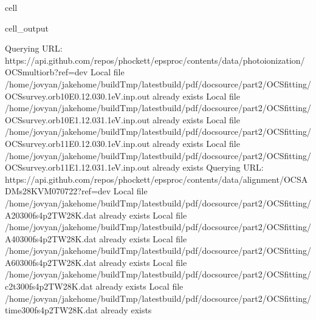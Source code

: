 \documentclass[letterpaper,table,10pt,english]{jupyterBook}
\begin{document}
\begin{sphinxuseclass}{cell}
\begin{sphinxVerbatimOutput}
\begin{sphinxuseclass}{cell_output}
\begin{sphinxVerbatim}[commandchars=\\\{\}]
Querying URL: https://api.github.com/repos/phockett/epsproc/contents/data/photoionization/OCS\PYGZus{}multiorb?ref=dev
Local file /home/jovyan/jake\PYGZhy{}home/buildTmp/\PYGZus{}latest\PYGZus{}build/pdf/doc\PYGZhy{}source/part2/OCSfitting/OCS\PYGZus{}survey.orb10\PYGZus{}E0.1\PYGZus{}2.0\PYGZus{}30.1eV.inp.out already exists
Local file /home/jovyan/jake\PYGZhy{}home/buildTmp/\PYGZus{}latest\PYGZus{}build/pdf/doc\PYGZhy{}source/part2/OCSfitting/OCS\PYGZus{}survey.orb10\PYGZus{}E1.1\PYGZus{}2.0\PYGZus{}31.1eV.inp.out already exists
Local file /home/jovyan/jake\PYGZhy{}home/buildTmp/\PYGZus{}latest\PYGZus{}build/pdf/doc\PYGZhy{}source/part2/OCSfitting/OCS\PYGZus{}survey.orb11\PYGZus{}E0.1\PYGZus{}2.0\PYGZus{}30.1eV.inp.out already exists
Local file /home/jovyan/jake\PYGZhy{}home/buildTmp/\PYGZus{}latest\PYGZus{}build/pdf/doc\PYGZhy{}source/part2/OCSfitting/OCS\PYGZus{}survey.orb11\PYGZus{}E1.1\PYGZus{}2.0\PYGZus{}31.1eV.inp.out already exists
Querying URL: https://api.github.com/repos/phockett/epsproc/contents/data/alignment/OCS\PYGZus{}ADMs\PYGZus{}28K\PYGZus{}VM\PYGZus{}070722?ref=dev
Local file /home/jovyan/jake\PYGZhy{}home/buildTmp/\PYGZus{}latest\PYGZus{}build/pdf/doc\PYGZhy{}source/part2/OCSfitting/A20\PYGZus{}300fs\PYGZus{}4p2TW\PYGZus{}28K.dat already exists
Local file /home/jovyan/jake\PYGZhy{}home/buildTmp/\PYGZus{}latest\PYGZus{}build/pdf/doc\PYGZhy{}source/part2/OCSfitting/A40\PYGZus{}300fs\PYGZus{}4p2TW\PYGZus{}28K.dat already exists
Local file /home/jovyan/jake\PYGZhy{}home/buildTmp/\PYGZus{}latest\PYGZus{}build/pdf/doc\PYGZhy{}source/part2/OCSfitting/A60\PYGZus{}300fs\PYGZus{}4p2TW\PYGZus{}28K.dat already exists
Local file /home/jovyan/jake\PYGZhy{}home/buildTmp/\PYGZus{}latest\PYGZus{}build/pdf/doc\PYGZhy{}source/part2/OCSfitting/c2t\PYGZus{}300fs\PYGZus{}4p2TW\PYGZus{}28K.dat already exists
Local file /home/jovyan/jake\PYGZhy{}home/buildTmp/\PYGZus{}latest\PYGZus{}build/pdf/doc\PYGZhy{}source/part2/OCSfitting/time\PYGZus{}300fs\PYGZus{}4p2TW\PYGZus{}28K.dat already exists
\end{sphinxVerbatim}

\end{sphinxuseclass}\end{sphinxVerbatimOutput}

\end{sphinxuseclass}
\end{document}
